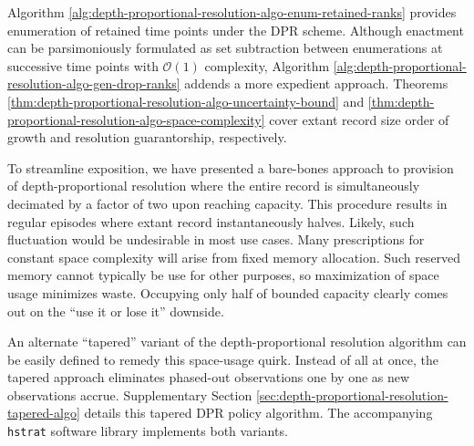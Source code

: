 Algorithm \ref{alg:depth-proportional-resolution-algo-enum-retained-ranks} provides enumeration of retained time points under the DPR scheme.
Although enactment can be parsimoniously formulated as set subtraction between enumerations at successive time points with $\mathcal{O}(1)$ complexity, Algorithm \ref{alg:depth-proportional-resolution-algo-gen-drop-ranks} addends a more expedient approach.
Theorems \ref{thm:depth-proportional-resolution-algo-uncertainty-bound} and \ref{thm:depth-proportional-resolution-algo-space-complexity} cover extant record size order of growth and resolution guarantorship, respectively.

To streamline exposition, we have presented a bare-bones approach to provision of depth-proportional resolution where the entire record is simultaneously decimated by a factor of two upon reaching capacity.
This procedure results in regular episodes where extant record instantaneously halves.
Likely, such fluctuation would be undesirable in most use cases.
Many prescriptions for constant space complexity will arise from fixed memory allocation.
Such reserved memory cannot typically be use for other purposes, so maximization of space usage minimizes waste.
Occupying only half of bounded capacity clearly comes out on the ``use it or lose it'' downside.

An alternate ``tapered'' variant of the depth-proportional resolution algorithm can be easily defined to remedy this space-usage quirk.
Instead of all at once, the tapered approach eliminates phased-out observations one by one as new observations accrue.
Supplementary Section \ref{sec:depth-proportional-resolution-tapered-algo} details this tapered DPR policy algorithm.
The accompanying \texttt{hstrat} software library implements both variants.

